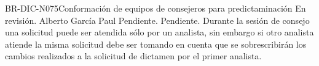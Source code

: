 \begin{BusinessRule}{BR-DIC-N075}{Conformación de equipos de consejeros para predictaminación}
	{\bcCondition}    %
	{\btEnabler}     %
	{\blControlling}    %
	\BRItem[Estado] En revisión.
	 Alberto García Paul 
	 Pendiente.
	 Pendiente.
	\BRItem[Descripción] Durante la sesión de consejo una solicitud puede ser atendida sólo por un analista, sin embargo si otro analista atiende la misma solicitud debe ser tomando en cuenta que se sobrescribirán los cambios realizados a la solicitud de dictamen por el primer analista.
	\BRItem[Sentencia]	\cdtEmpty
	
	
	\BRItem[Motivación] 
	
	
\end{BusinessRule}



